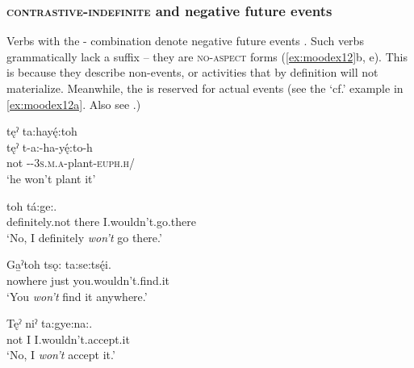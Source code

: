 \largerpage
\subsubsection*{ \textsc{contrastive-indefinite} and negative future events} \label{[ta:] contrastive-indefinite and negative future events}
Verbs with the  \textsc{\contrastive-\indefinite} combination denote negative future events . Such verbs grammatically lack a  {\punctual} suffix -- they are \textsc{no-aspect} forms (\ref{ex:moodex12}b, e). This is because they describe non-events, or activities that by definition will not materialize. Meanwhile, the  {\punctual} is reserved for actual events (see the ‘cf.’ example in \ref{ex:moodex12a}. Also see .) 

\ea\label{ex:moodex12}

\ea tęˀ ta:hayę́:toh \\ \label{ex:moodex12a}
\gll tęˀ t-a:-ha-yę́:to-h\\
not {\contrastive}-{\indefinite}-\textsc{3s.m.a}-plant-\textsc{euph.h}/{\noaspect}\\
\glt ‘he won’t plant it’

\ex
{} toh tá:ge:.\\
definitely.not there I.wouldn’t.go.there\\
\glt ‘No, I definitely \emph{won’t} go there.’

\ex
\gll Ga̱ˀtoh tsǫ: ta:se:tsę́i. \\
nowhere just you.wouldn’t.find.it\\
\glt ‘You \emph{won’t} find it anywhere.’ 

\ex
\gll Tęˀ niˀ ta:gye:na:. \\
not I I.wouldn’t.accept.it\\
\glt ‘No, I \emph{won’t} accept it.’ 

